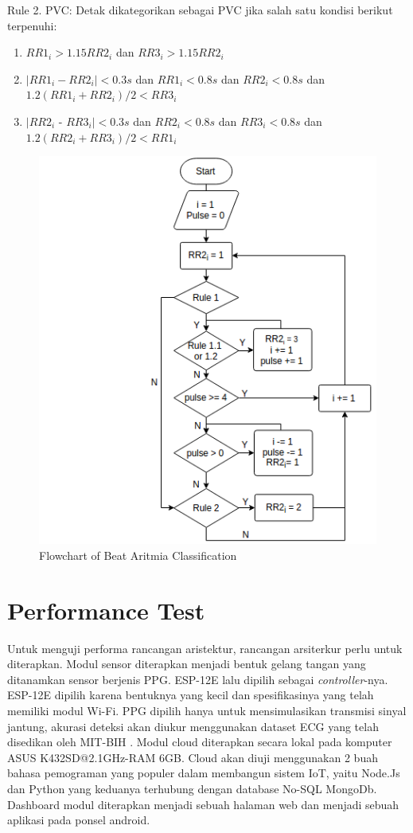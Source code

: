 \documentclass[conference]{IEEEtran}
\begin{document}
Rule 2. PVC: Detak dikategorikan sebagai PVC jika salah satu kondisi berikut terpenuhi:

\begin{enumerate}
	\item $RR1_i > 1.15RR2_i$ dan $RR3_i > 1.15RR2_i$
	\item $|RR1_i - RR2_i| < 0.3s$ dan $RR1_i < 0.8s$ dan $RR2_i < 0.8s$ dan $1.2(RR1_i + RR2_i)/2 < RR3_i$
	\item $|RR2_i$ - $RR3_i| < 0.3s$ dan $RR2_i < 0.8s$ dan $RR3_i < 0.8s$ dan $1.2(RR2_i + RR3_i)/2 < RR1_i$
\end{enumerate}

\begin{figure}[htbp]
\centerline{\includegraphics[scale=0.55]{images/flowchart_aritmia.png}}
\caption{Flowchart of Beat Aritmia Classification}
\label{fig:flowchart_aritmia}
\end{figure}

\section{Performance Test}
Untuk menguji performa rancangan aristektur, rancangan arsiterkur perlu untuk diterapkan. Modul sensor diterapkan menjadi bentuk gelang tangan yang ditanamkan sensor berjenis PPG. ESP-12E lalu dipilih sebagai \textit{controller}-nya. ESP-12E dipilih karena bentuknya yang kecil dan spesifikasinya yang telah memiliki modul Wi-Fi. PPG dipilih hanya untuk mensimulasikan transmisi sinyal jantung, akurasi deteksi akan diukur menggunakan dataset ECG yang telah disedikan oleh MIT-BIH \cite{mit_bih_paper, physionet}. Modul cloud diterapkan secara lokal pada komputer ASUS K432SD@2.1GHz-RAM 6GB. Cloud akan diuji menggunakan 2 buah bahasa pemograman yang populer dalam membangun sistem IoT, yaitu Node.Js dan Python yang keduanya terhubung dengan database No-SQL MongoDb. Dashboard modul diterapkan menjadi sebuah halaman web dan menjadi sebuah aplikasi pada ponsel android.
\end{document}
